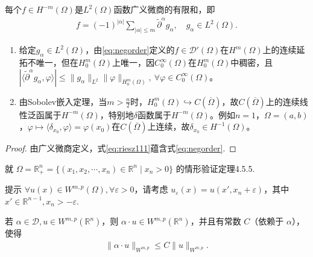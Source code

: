 \documentclass[../../main.tex]{subfiles}%
\begin{document}
\begin{corollary}
每个$f\in H^{-m}(\Omega)$是$L^{2}(\Omega)$函数广义微商的有限和，即
\begin{align}
f=(-1)^{|\alpha|}\sum\limits_{|\alpha|\leqslant m}\widetilde{\partial}^{\alpha}g_{\alpha},\quad g_{\alpha}\in L^{2}(\Omega).\label{eq:negorder}
\end{align}
\end{corollary}
\begin{remark}
\begin{enumerate}[(1)]
\item 给定$g_{\alpha}\in L^{2}(\Omega)$，由\eqref{eq:negorder}定义的$f\in\mathscr{D}'(\Omega)$在$H^{m}(\Omega)$上的连续延拓不唯一，但在$H_{0}^{m}(\Omega)$上唯一，因$C_{0}^{\infty}(\Omega)$在$H_{0}^{m}(\Omega)$中稠密，且$|\langle\widetilde{\partial}^{\alpha}g_{\alpha},\varphi\rangle|\leqslant\|g_{\alpha}\|_{L^{2}}\|\varphi\|_{H_{0}^{m}(\Omega)},\ \forall\varphi\in C_{0}^{\infty}(\Omega)$。
\item 由Sobolev嵌入定理，当$m>\frac{n}{2}$时，$H_{0}^{m}(\Omega)\hookrightarrow C(\overline{\Omega})$，故$C(\overline{\Omega})$上的连续线性泛函属于$H^{-m}(\Omega)$，特别地$\delta$函数属于$H^{-m}(\Omega)$。例如$n=1$，$\Omega=(a,b)$，$\varphi\mapsto\langle\delta_{x_{0}},\varphi\rangle=\varphi(x_{0})$在$C(\overline{\Omega})$上连续，故$\delta_{x_{0}}\in H^{-1}(\Omega)$。
\end{enumerate}
\end{remark}
\begin{proof}
由广义微商定义，式\eqref{eq:riesz111}蕴含式\eqref{eq:negorder}.
\end{proof}

\begin{example}
就 $\Omega=\mathbb{R}_+^n=\{(x_1,x_2,\cdots,x_n)\in\mathbb{R}^n\mid x_n>0\}$ 的情形验证定理4.5.5.

提示 $\forall u(x)\in W^{m,p}(\Omega),\forall\varepsilon>0$，请考虑 $u_\varepsilon(x)=u(x',x_n+\varepsilon)$，其中 $x'\in\mathbb{R}^{n-1},x_n>-\varepsilon$.
\end{example}

\begin{example}
若 $\alpha\in\mathscr{D},u\in W^{m,p}(\mathbb{R}^n)$，则 $\alpha\cdot u\in W^{m,p}(\mathbb{R}^n)$，并且有常数 $C$（依赖于 $\alpha$），使得
\begin{align*}
\|\alpha\cdot u\|_{W^{m,p}}\leqslant C\|u\|_{W^{m,p}}.
\end{align*}
\end{example}
\end{document}
